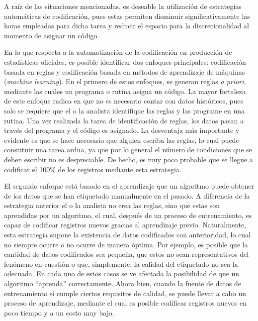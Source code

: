 \documentclass[
  12pt,
  spanish,
]{article}
\begin{document}
A raíz de las situaciones mencionadas, es deseable la utilización de
estrategias automáticas de codificación, pues estas permiten disminuir
significativamente las horas empleadas para dicha tarea y reducir el
espacio para la discrecionalidad al momento de asignar un código.

En lo que respecta a la automatización de la codificación en producción
de estadísticas oficiales, es posible identificar dos enfoques
principales: codificación basada en reglas y codificación basada en
métodos de aprendizaje de máquinas (\emph{machine learning}). En el
primero de estos enfoques, se generan reglas \emph{a priori}, mediante
las cuales un programa o rutina asigna un código. La mayor fortaleza de
este enfoque radica en que no es necesario contar con datos históricos,
pues solo se requiere que el o la analista identifique las reglas y las
programe en una rutina. Una vez realizada la tarea de identificación de
reglas, los datos pasan a través del programa y el código es asignado.
La desventaja más importante y evidente es que se hace necesario que
alguien escriba las reglas, lo cual puede constituir una tarea ardua, ya
que por lo general el número de condiciones que se deben escribir no es
despreciable. De hecho, es muy poco probable que se llegue a codificar
el 100\% de los registros mediante esta estrategia.

El segundo enfoque está basado en el aprendizaje que un algoritmo puede
obtener de los datos que se han etiquetado manualmente en el pasado. A
diferencia de la estrategia anterior el o la analista no crea las
reglas, sino que estas son aprendidas por un algoritmo, el cual, después
de un proceso de entrenamiento, es capaz de codificar registros nuevos
gracias al aprendizaje previo. Naturalmente, esta estrategia supone la
existencia de datos codificados con anterioridad, lo cual no siempre
ocurre o no ocurre de manera óptima. Por ejemplo, es posible que la
cantidad de datos codificados sea pequeña, que estos no sean
representativos del fenómeno en cuestión o que, simplemente, la calidad
del etiquetado no sea la adecuada. En cada uno de estos casos se ve
afectada la posibilidad de que un algoritmo ``aprenda'' correctamente.
Ahora bien, cuando la fuente de datos de entrenamiento sí cumple ciertos
requisitos de calidad, se puede llevar a cabo un proceso de aprendizaje,
mediante el cual es posible codificar registros nuevos en poco tiempo y
a un costo muy bajo.
\end{document}
